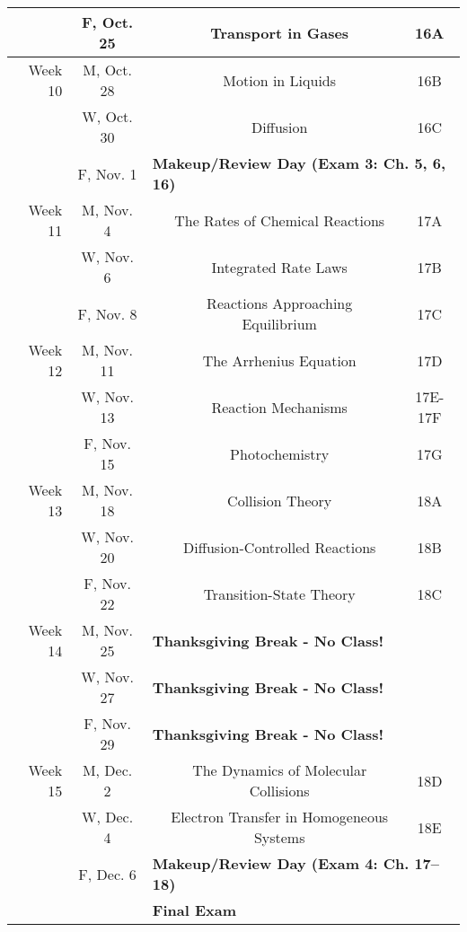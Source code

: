 \begin{tabular}{rcccc}
& F, Oct. 25&& Transport in Gases & 16A\\
\midrule
Week 10 & M, Oct. 28&& Motion in Liquids & 16B\\
& W, Oct. 30&& Diffusion & 16C\\
& F, Nov. 1& \multicolumn{3}{l}{\textbf{Makeup/Review Day (Exam 3: Ch. 5, 6, 16)}}\\
\midrule
Week 11 & M, Nov. 4&& The Rates of Chemical Reactions & 17A\\
& W, Nov. 6&& Integrated Rate Laws & 17B\\
& F, Nov. 8&& Reactions Approaching Equilibrium & 17C\\
\midrule
Week 12 & M, Nov. 11&& The Arrhenius Equation & 17D\\
& W, Nov. 13&& Reaction Mechanisms & 17E-17F\\
& F, Nov. 15&& Photochemistry & 17G\\
\midrule
Week 13 & M, Nov. 18&& Collision Theory & 18A\\
& W, Nov. 20&& Diffusion-Controlled Reactions & 18B\\
& F, Nov. 22&& Transition-State Theory & 18C\\
\midrule
Week 14 & M, Nov. 25& \multicolumn{3}{l}{\textbf{Thanksgiving Break - No Class!}}\\
& W, Nov. 27& \multicolumn{3}{l}{\textbf{Thanksgiving Break - No Class!}}\\
& F, Nov. 29& \multicolumn{3}{l}{\textbf{Thanksgiving Break - No Class!}}\\
\midrule
Week 15 & M, Dec. 2&& The Dynamics of Molecular Collisions & 18D\\
& W, Dec. 4&& Electron Transfer in Homogeneous Systems & 18E\\
& F, Dec. 6& \multicolumn{3}{l}{\textbf{Makeup/Review Day (Exam 4: Ch. 17--18)}}\\
\midrule
\midrule
& & \multicolumn{3}{l}{\textbf{Final Exam}}\\
\end{tabular}